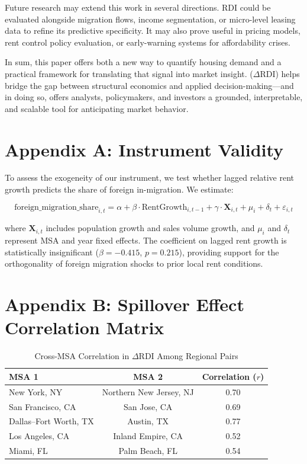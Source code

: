 \documentclass[APA,Times1COL]{WileyNJDv5} %
\begin{document}
Future research may extend this work in several directions. RDI could be evaluated alongside migration flows, income segmentation, or micro-level leasing data to refine its predictive specificity. It may also prove useful in pricing models, rent control policy evaluation, or early-warning systems for affordability crises.

In sum, this paper offers both a new way to quantify housing demand and a practical framework for translating that signal into market insight. (\(\Delta\text{RDI}\)) helps bridge the gap between structural economics and applied decision-making—and in doing so, offers analysts, policymakers, and investors a grounded, interpretable, and scalable tool for anticipating market behavior.

\section*{Appendix A: Instrument Validity}
\label{sec:appendixa}

To assess the exogeneity of our instrument, we test whether lagged relative rent growth predicts the share of foreign in-migration. We estimate:

\[
\text{foreign\_migration\_share}_{i,t} = \alpha + \beta \cdot \text{RentGrowth}_{i,t-1} + \gamma \cdot \textbf{X}_{i,t} + \mu_i + \delta_t + \varepsilon_{i,t}
\]

where $\textbf{X}_{i,t}$ includes population growth and sales volume growth, and $\mu_i$ and $\delta_t$ represent MSA and year fixed effects. The coefficient on lagged rent growth is statistically insignificant ($\beta = -0.415$, $p = 0.215$), providing support for the orthogonality of foreign migration shocks to prior local rent conditions.
\section*{Appendix B: Spillover Effect Correlation Matrix}
\begin{table}[h]
	\centering
	\caption{Cross-MSA Correlation in $\Delta \text{RDI}$ Among Regional Pairs}
	\label{tab:regional_corr}
	\begin{tabular}{lcc}
		\toprule
		MSA 1 & MSA 2 & Correlation ($r$) \\
		\midrule
		New York, NY & Northern New Jersey, NJ & 0.70 \\
		San Francisco, CA & San Jose, CA & 0.69 \\
		Dallas–Fort Worth, TX & Austin, TX & 0.77 \\
		Los Angeles, CA & Inland Empire, CA & 0.52 \\
		Miami, FL & Palm Beach, FL & 0.54 \\
		\bottomrule
	\end{tabular}
\end{table}
\end{document}

